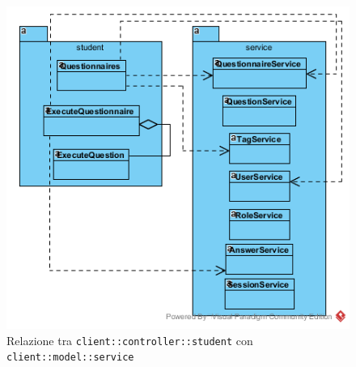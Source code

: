 \begin{center}
	\begin{figure}[H]
		\centering \includegraphics[scale=4, max width=\textwidth, max height=\myheight]{../img/diagrammiClassi/client/controller/controllerStudent_modelService.png}
		\caption{Relazione tra \texttt{client::controller::student} con \texttt{client::model::service}}
	\end{figure}
\end{center}


